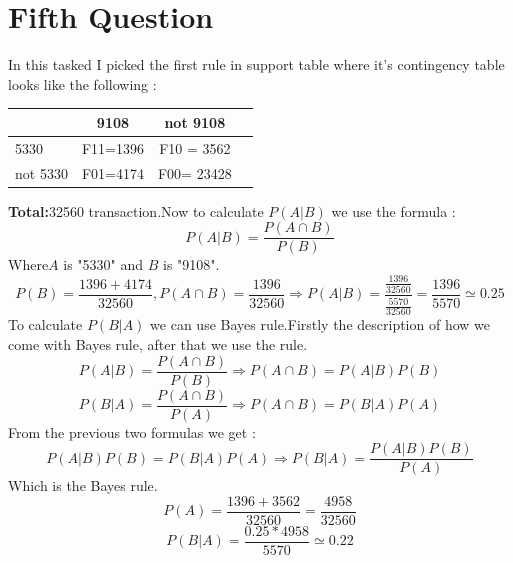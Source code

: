 \documentclass{article}
\begin{document}
\section*{Fifth Question}
In this tasked I picked the first rule in support table where it's contingency table looks like the following : \\
\begin{tabular}{|l|*{3}{c|}}
	\hline
&9108&not 9108 \\ \hline
5330&F11=1396&F10 = 3562\\ \hline
not 5330&F01=4174&F00= 23428 \\ \hline
\end{tabular}
\textbf{Total:}32560 transaction.Now to calculate \(P(A|B)\) we use the formula :\[P(A|B)=\frac{P(A\cap B)}{P(B)}\] Where\(A\) is "5330" and \(B\) is "9108".
\[P(B) = \frac{1396+4174}{32560},P(A\cap B)=\frac{1396}{32560}\Longrightarrow P(A|B) = \frac{\frac{1396}{32560}}{\frac{5570}{32560}}=\frac{1396}{5570} \simeq 0.25\]
To calculate \(P(B|A)\) we can use Bayes rule.Firstly the description of how we come with Bayes rule, after that we use the rule.
\[P(A|B) = \frac{P(A\cap B)}{P(B)}\Longrightarrow P(A\cap B) = P(A|B)P(B) \]
\[P(B|A) = \frac{P(A\cap B)}{P(A)}\Longrightarrow P(A\cap B) = P(B|A)P(A) \]
From the previous two formulas we get : 
\[P(A|B)P(B) = P(B|A)P(A) \Longrightarrow P(B|A) = \frac{P(A|B)P(B)}{P(A)}\]
Which is the Bayes rule.
\[P(A) = \frac{1396+3562}{32560} = \frac{4958}{32560}\]
\[P(B|A) = \frac{0.25* 4958}{5570}\simeq 0.22 \]
\end{document}

